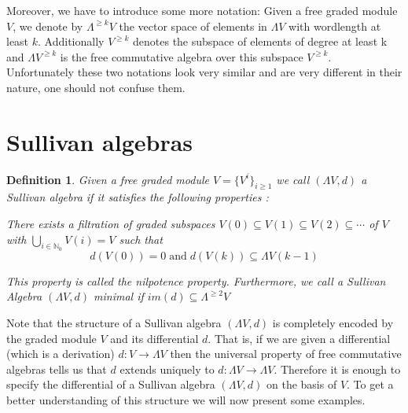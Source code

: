 \documentclass[12pt,a4paper]{scrartcl}
\newtheorem{Definition}[Theorem]{Definition}
\numberwithin{equation}{section}
\newcommand{\N}{\mathbb{N}} %
\newcommand{\Sullivan}{(\Lambda V,d)}
\begin{document}
 

\centerline{
}



Moreover, we have to introduce some more notation: Given a free graded module $V$, we denote 
by $\Lambda^{\geq k} V$ the vector space of elements in $\Lambda V$ with wordlength at least $k$.
Additionally $V^{\geq k}$ denotes the subspace of elements of degree at least k and ${\Lambda V}^{\geq k}$ 
is the free commutative algebra over this subspace $V^{\geq k}$. Unfortunately these two notations look 
very similar and are very different in their nature, one should not confuse them.

 \newpage  %
 
\section{Sullivan algebras}

\begin{Definition}
 Given a free graded module $V = {\lbrace {V^i}\rbrace}_{ i \geq 1} $ we call $(\Lambda V, d)$ a \emph{Sullivan algebra} 
 if it satisfies the following properties :
 
  There exists a filtration of graded subspaces $V(0) \subseteq V(1) \subseteq V(2) \subseteq \cdots $ of $V$
  with $\bigcup_{i \in \N_0} V(i) = V$ such that 
  $$ d(V(0)) = 0 \; \text{and} \; d( V(k)) \subseteq  \Lambda V(k-1) $$
  
 This property is called the \emph{nilpotence} property.
 Furthermore, we call a Sullivan Algebra $(\Lambda V,d)$ \emph{minimal} if $im(d) \subseteq \Lambda^{\geq 2} V$
\end{Definition}

Note that the structure of a Sullivan algebra $\Sullivan$ is completely encoded by the graded module $V$ and its
differential $d$. That is, if we are given a differential (which is a derivation) $d \colon V \to \Lambda V$ then the
universal property of free commutative algebras tells us that $d$ extends uniquely to $d \colon \Lambda V \to \Lambda V$.
Therefore it is enough to specify the differential of a Sullivan algebra $\Sullivan$ on the basis of $V$.
To get a better understanding of this structure we will now present some examples.
\end{document}

